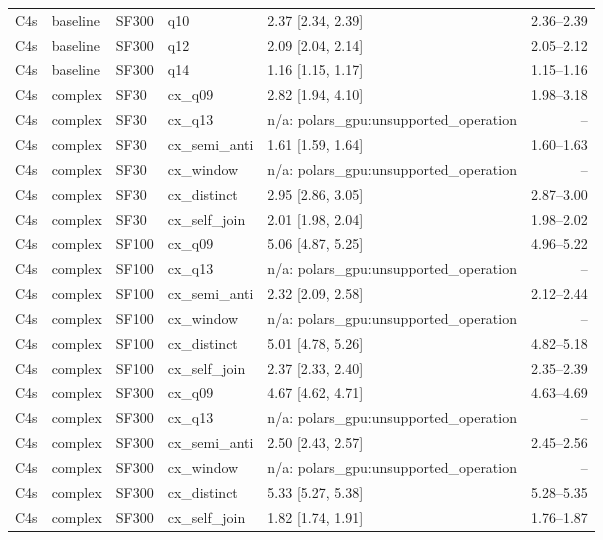 \begin{longtable}{lllllr}
C4s & baseline & SF300 & q10 & 2.37 [2.34, 2.39] & 2.36--2.39 \\
C4s & baseline & SF300 & q12 & 2.09 [2.04, 2.14] & 2.05--2.12 \\
C4s & baseline & SF300 & q14 & 1.16 [1.15, 1.17] & 1.15--1.16 \\
C4s & complex & SF30 & cx\_q09 & 2.82 [1.94, 4.10] & 1.98--3.18 \\
C4s & complex & SF30 & cx\_q13 & n/a: polars\_gpu:unsupported\_operation & -- \\
C4s & complex & SF30 & cx\_semi\_anti & 1.61 [1.59, 1.64] & 1.60--1.63 \\
C4s & complex & SF30 & cx\_window & n/a: polars\_gpu:unsupported\_operation & -- \\
C4s & complex & SF30 & cx\_distinct & 2.95 [2.86, 3.05] & 2.87--3.00 \\
C4s & complex & SF30 & cx\_self\_join & 2.01 [1.98, 2.04] & 1.98--2.02 \\
C4s & complex & SF100 & cx\_q09 & 5.06 [4.87, 5.25] & 4.96--5.22 \\
C4s & complex & SF100 & cx\_q13 & n/a: polars\_gpu:unsupported\_operation & -- \\
C4s & complex & SF100 & cx\_semi\_anti & 2.32 [2.09, 2.58] & 2.12--2.44 \\
C4s & complex & SF100 & cx\_window & n/a: polars\_gpu:unsupported\_operation & -- \\
C4s & complex & SF100 & cx\_distinct & 5.01 [4.78, 5.26] & 4.82--5.18 \\
C4s & complex & SF100 & cx\_self\_join & 2.37 [2.33, 2.40] & 2.35--2.39 \\
C4s & complex & SF300 & cx\_q09 & 4.67 [4.62, 4.71] & 4.63--4.69 \\
C4s & complex & SF300 & cx\_q13 & n/a: polars\_gpu:unsupported\_operation & -- \\
C4s & complex & SF300 & cx\_semi\_anti & 2.50 [2.43, 2.57] & 2.45--2.56 \\
C4s & complex & SF300 & cx\_window & n/a: polars\_gpu:unsupported\_operation & -- \\
C4s & complex & SF300 & cx\_distinct & 5.33 [5.27, 5.38] & 5.28--5.35 \\
C4s & complex & SF300 & cx\_self\_join & 1.82 [1.74, 1.91] & 1.76--1.87 \\
\end{longtable}
